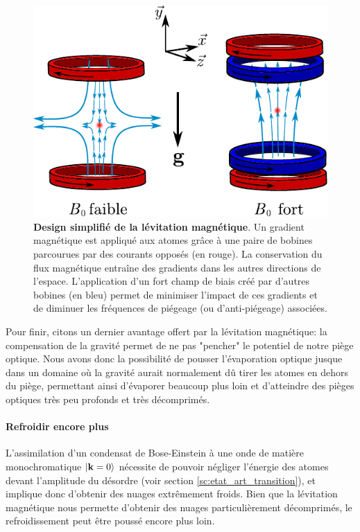 \begin{figure}
\centering
\includegraphics[scale=1]{Fig/BEC_manip/levitation_simple.pdf}
\caption{\textbf{Design simplifié de la lévitation magnétique}. Un gradient magnétique est appliqué aux atomes grâce à une paire de bobines parcourues par des courants opposés (en rouge). La conservation du flux magnétique entraîne des gradients dans les autres directions de l'espace. L'application d'un fort champ de biais créé par d'autres bobines (en bleu) permet de minimiser l'impact de ces gradients et de diminuer les fréquences de piégeage (ou d'anti-piégeage) associées.}
\label{fig:levitation_simple}
\end{figure}

Pour finir, citons un dernier avantage offert par la lévitation magnétique: la compensation de la gravité permet de ne pas "pencher" le potentiel de notre piège optique. Nous avons donc la possibilité de pousser l'évaporation optique jusque dans un domaine où la gravité aurait normalement dû tirer les atomes en dehors du piège, permettant ainsi d'évaporer beaucoup plus loin et d'atteindre des pièges optiques très peu profonds et très décomprimés.



\paragraph*{Refroidir encore plus}
L'assimilation d'un condensat de Bose-Einstein à une onde de matière monochromatique $\left| \mathbf{k}=0 \right\rangle$ nécessite de pouvoir négliger l'énergie des atomes devant l'amplitude du désordre (voir section \ref{sc:etat_art_transition}), et implique donc d'obtenir des nuages extrêmement froids. Bien que la lévitation magnétique nous permette d'obtenir des nuages particulièrement décomprimés, le refroidissement peut être poussé encore plus loin. 

